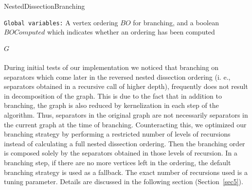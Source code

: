 \documentclass[12pt,a4paper,twoside]{scrartcl}
\numberwithin{equation}{section}
\let\oldnl\nl%
\newcommand{\nonl}{\renewcommand{\nl}{\let\nl\oldnl}}%
\begin{document}
\begin{algorithm}
	\caption{NestedDissectionBranching}\label{alg:nd}
	\DontPrintSemicolon
	\nonl\texttt{Global variables:} A vertex ordering $BO$ for branching, and a boolean $BOComputed$ which indicates whether an ordering has been computed\\
	
	\U{$G$}	
	
	
\end{algorithm}


\paragraph{} 
During initial tests of our implementation we noticed that branching on separators which come later in the reversed nested dissection ordering (i. e., separators obtained in a recursive call of higher depth), frequently does not result in decomposition of the graph. This is due to the fact that in addition to branching, the graph is also reduced by kernelization in each step of the algorithm. Thus, separators in the original graph are not necessarily separators in the current graph at the time of branching. Counteracting this, we optimized our branching strategy by performing a restricted number of levels of recursions instead of calculating a full nested dissection ordering. Then the branching order is composed solely by the separators obtained in those levels of recursion. In a branching step, if there are no more vertices left in the ordering, the default branching strategy is used as a fallback. The exact number of recursions used is a tuning parameter. Details are discussed in the following section (Section~\ref{sec5}).
\end{document}

